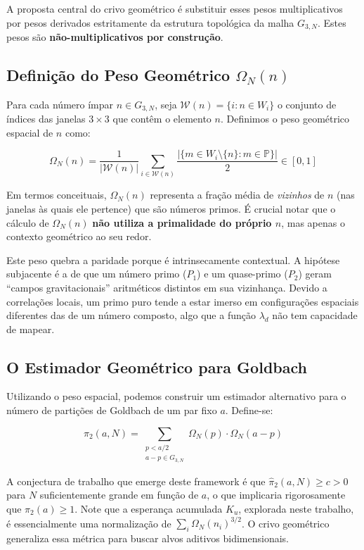 \documentclass[12pt,a4paper]{article}
\theoremstyle{remark}
\begin{document}
	A proposta central do crivo geométrico é substituir esses pesos multiplicativos por pesos derivados estritamente da estrutura topológica da malha $G_{3,N}$. Estes pesos são \textbf{não-multiplicativos por construção}.
	
	\subsection{Definição do Peso Geométrico $\Omega_N(n)$}
	
	Para cada número ímpar $n \in G_{3,N}$, seja $\mathcal{W}(n) = \{i : n \in W_i\}$ o conjunto de índices das janelas $3 \times 3$ que contêm o elemento $n$. Definimos o peso geométrico espacial de $n$ como:
	
	\begin{equation}
		\Omega_N(n) = \frac{1}{|\mathcal{W}(n)|} \sum_{i \in \mathcal{W}(n)} \frac{|\{m \in W_i \setminus \{n\} : m \in \mathbb{P}\}|}{2} \in [0, 1]
	\end{equation}
	
	Em termos conceituais, $\Omega_N(n)$ representa a fração média de \textit{vizinhos} de $n$ (nas janelas às quais ele pertence) que são números primos. É crucial notar que o cálculo de $\Omega_N(n)$ \textbf{não utiliza a primalidade do próprio $n$}, mas apenas o contexto geométrico ao seu redor.
	
	Este peso quebra a paridade porque é intrinsecamente contextual. A hipótese subjacente é a de que um número primo ($P_1$) e um quase-primo ($P_2$) geram ``campos gravitacionais'' aritméticos distintos em sua vizinhança. Devido a correlações locais, um primo puro tende a estar imerso em configurações espaciais diferentes das de um número composto, algo que a função $\lambda_d$ não tem capacidade de mapear.
	
	\subsection{O Estimador Geométrico para Goldbach}
	
	Utilizando o peso espacial, podemos construir um estimador alternativo para o número de partições de Goldbach de um par fixo $a$. Define-se:
	
	\begin{equation}
		\hat{\pi}_2(a, N) = \sum_{\substack{p < a/2 \\ a-p \in G_{3,N}}} \Omega_N(p) \cdot \Omega_N(a-p)
	\end{equation}
	
	A conjectura de trabalho que emerge deste framework é que $\hat{\pi}_2(a, N) \geq c > 0$ para $N$ suficientemente grande em função de $a$, o que implicaria rigorosamente que $\pi_2(a) \geq 1$. Note que a esperança acumulada $K_u$, explorada neste trabalho, é essencialmente uma normalização de $\sum_i \Omega_N(n_i)^{3/2}$. O crivo geométrico generaliza essa métrica para buscar alvos aditivos bidimensionais.
	
\end{document}
